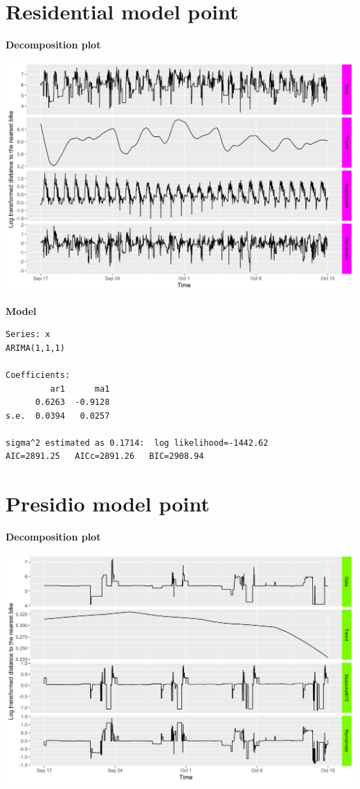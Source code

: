 \documentclass[12pt,oneside]{reedthesis}
\begin{document}
\section{Residential model point}\label{residential-model-point}

\textbf{Decomposition plot}

\includegraphics[width=\textwidth]{Figures/stlplot_model3}

\textbf{Model}
\begin{verbatim}
Series: x 
ARIMA(1,1,1) 

Coefficients:
         ar1      ma1
      0.6263  -0.9128
s.e.  0.0394   0.0257

sigma^2 estimated as 0.1714:  log likelihood=-1442.62
AIC=2891.25   AICc=2891.26   BIC=2908.94
\end{verbatim}
\newpage

\section{Presidio model point}\label{presidio-model-point}

\textbf{Decomposition plot}

\includegraphics[width=\textwidth]{Figures/stlplot_model4}
\end{document}
